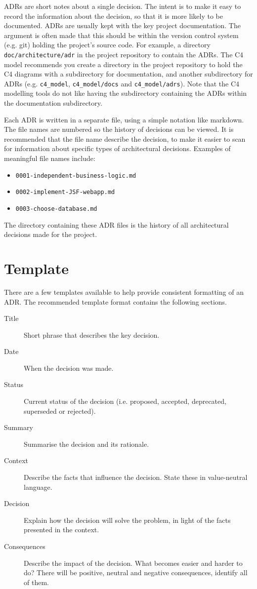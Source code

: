 ADRs are short notes about a single decision.
The intent is to make it easy to record the information about the decision, so that it is more likely to be documented.
ADRs are usually kept with the key project documentation.
The argument is often made that this should be within the version control system (e.g. git) holding the project's source code.
For example, a directory \texttt{doc/architecture/adr} in the project repository to contain the ADRs.
The C4 model recommends you create a directory in the project repository to hold the C4 diagrams
with a subdirectory for documentation, and another subdirectory for ADRs
(e.g. \texttt{c4\_model}, \texttt{c4\_model/docs} and \texttt{c4\_model/adrs}).
Note that the C4 modelling tools do not like having the subdirectory containing the ADRs within the documentation subdirectory.

Each ADR is written in a separate file, using a simple notation like markdown.
The file names are numbered so the history of decisions can be viewed.
It is recommended that the file name describe the decision,
to make it easier to scan for information about specific types of architectural decisions.
Examples of meaningful file names include:
\begin{itemize}[topsep=0pt,noitemsep]
    \item \texttt{0001-independent-business-logic.md}
    \item \texttt{0002-implement-JSF-webapp.md}
    \item \texttt{0003-choose-database.md}
\end{itemize}
The directory containing these ADR files is the history of all architectural decisions made for the project.

\section{Template}
There are a few templates available to help provide consistent formatting of an ADR.
The recommended template format contains the following sections.
\begin{description}
    \item[Title] Short phrase that describes the key decision.
    \item[Date] When the decision was made.
    \item[Status] Current status of the decision (i.e. proposed, accepted, deprecated, superseded or rejected).
    \item[Summary] Summarise the decision and its rationale.
    \item[Context] Describe the facts that influence the decision. State these in value-neutral language.
    \item[Decision] Explain how the decision will solve the problem, in light of the facts presented in the context.
    \item[Consequences] Describe the impact of the decision. What becomes easier and harder to do?
                        There will be positive, neutral and negative consequences, identify all of them.
\end{description}

